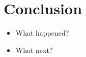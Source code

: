 \documentclass{article}
\begin{document}
\section{Conclusion}

\begin{itemize}
\item What happened?
\item What next?
\end{itemize}

\lipsum[4-6]







\end{document}
